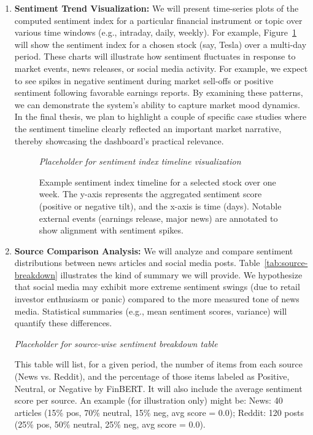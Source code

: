 \documentclass[12pt]{article}
\begin{document}
\begin{enumerate}
  \item \textbf{Sentiment Trend Visualization:} We will present time-series plots of the computed sentiment
        index for a particular financial instrument or topic over various time windows (e.g., intraday,
        daily, weekly). For example, Figure~\ref{fig:timeline} will show the sentiment index for a chosen
        stock (say, Tesla) over a multi-day period. These charts will illustrate how sentiment fluctuates in
        response to market events, news releases, or social media activity. For example, we expect to see
        spikes in negative sentiment during market sell-offs or positive sentiment following favorable
        earnings reports. By examining these patterns, we can demonstrate the system's ability to capture
        market mood dynamics. In the final thesis, we plan to highlight a couple of specific case studies
        where the sentiment timeline clearly reflected an important market narrative, thereby showcasing the
        dashboard's practical relevance.

  \begin{figure}[h!]
    \centering
    \textit{Placeholder for sentiment index timeline visualization}
    \caption{Example sentiment index timeline for a selected stock over one week. The y-axis
            represents the aggregated sentiment score (positive or negative tilt), and the x-axis is time
            (days). Notable external events (earnings release, major news) are annotated to show alignment
            with sentiment spikes.}
    \label{fig:timeline}
  \end{figure}

  \item \textbf{Source Comparison Analysis:} We will analyze and compare sentiment distributions
        between news articles and social media posts. Table~\ref{tab:source-breakdown} illustrates the kind
        of summary we will provide. We hypothesize that social media may exhibit more extreme sentiment
        swings (due to retail investor enthusiasm or panic) compared to the more measured tone of news media.
        Statistical summaries (e.g., mean sentiment scores, variance) will quantify these differences.

  \begin{table}[h!]
    \centering
    \textit{Placeholder for source-wise sentiment breakdown table}
    \caption{This table will list, for a given period, the number of items from each source (News vs. Reddit),
            and the percentage of those items labeled as Positive, Neutral, or Negative by FinBERT. It will
            also include the average sentiment score per source. An example (for illustration only) might be:
            {\small News: 40 articles (15\% pos, 70\% neutral, 15\% neg, avg score = 0.0); Reddit: 120 posts
            (25\% pos, 50\% neutral, 25\% neg, avg score = 0.0).}}
    \label{tab:source-breakdown}
  \end{table}


\end{enumerate}
\end{document}
